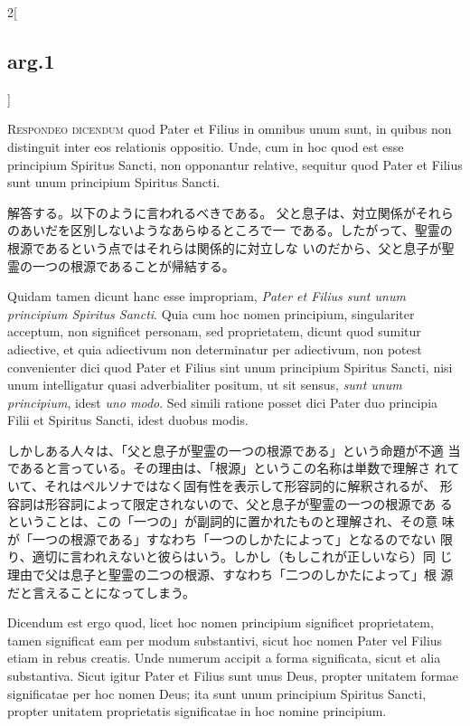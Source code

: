 \documentclass[paper=a4paper,fontsize=10pt,jafontsize=9pt,titlepage]{jlreq}
\begin{document}
\begin{paracol}{2}[\subsection{arg.1}]

{\scshape Respondeo dicendum} quod Pater et Filius in omnibus unum sunt, in
quibus non distinguit inter eos relationis oppositio. Unde, cum in hoc
quod est esse principium Spiritus Sancti, non opponantur relative,
sequitur quod Pater et Filius sunt unum principium  Spiritus
Sancti.

\switchcolumn

解答する。以下のように言われるべきである。
父と息子は、対立関係がそれらのあいだを区別しないようなあらゆるところで一
である。したがって、聖霊の根源であるという点ではそれらは関係的に対立しな
 いのだから、父と息子が聖霊の一つの根源であることが帰結する。

\switchcolumn*

Quidam tamen dicunt hanc esse impropriam, {\itshape Pater et Filius sunt
unum principium  Spiritus Sancti}. Quia cum hoc nomen principium,
singulariter acceptum, non significet personam, sed proprietatem,
dicunt quod sumitur adiective, et quia adiectivum non determinatur per
adiectivum, non potest convenienter dici quod Pater et Filius sint
unum principium Spiritus Sancti, nisi unum intelligatur quasi
adverbialiter positum, ut sit sensus, {\itshape sunt unum principium}, idest {\itshape uno
modo}. Sed simili ratione posset dici Pater duo principia Filii et
Spiritus Sancti, idest duobus modis.

\switchcolumn

しかしある人々は、「父と息子が聖霊の一つの根源である」という命題が不適
当であると言っている。その理由は、「根源」というこの名称は単数で理解さ
れていて、それはペルソナではなく固有性を表示して形容詞的に解釈されるが、
形容詞は形容詞によって限定されないので、父と息子が聖霊の一つの根源であ
るということは、この「一つの」が副詞的に置かれたものと理解され、その意
味が「一つの根源である」すなわち「一つのしかたによって」となるのでない
限り、適切に言われえないと彼らはいう。しかし（もしこれが正しいなら）同
じ理由で父は息子と聖霊の二つの根源、すなわち「二つのしかたによって」根
源だと言えることになってしまう。

\switchcolumn*

Dicendum est ergo quod, licet hoc
nomen principium significet proprietatem, tamen significat eam per
modum substantivi, sicut hoc nomen Pater vel Filius etiam in rebus
creatis. 
Unde numerum accipit a forma significata, sicut et alia
substantiva. Sicut igitur Pater et Filius sunt unus Deus, propter
unitatem formae significatae per hoc nomen Deus; ita sunt unum
principium Spiritus Sancti, propter unitatem proprietatis
significatae in hoc nomine principium.


\end{paracol}
\end{document}
